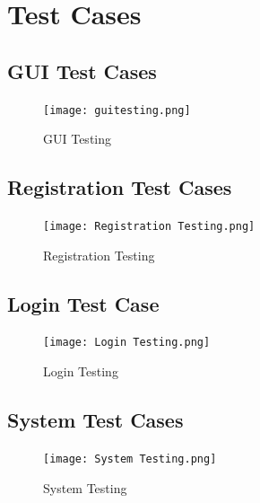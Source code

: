 \documentclass[12pt]{report}
\begin{document}
\clearpage


\centering
\section{Test Cases}
\justifying
\setlength{\parindent}{4em}
\setlength{\parskip}{0.5em}
\renewcommand{\baselinestretch}{1.5}
\normalsize
\subsection{GUI Test Cases}
\begin{figure}[h]
\centering
\texttt{[image: guitesting.png]}
\caption{GUI Testing
}
\label{GUI Testing
}
\end{figure}

\vspace{1cm}
\clearpage

\subsection{Registration Test Cases}

\begin{figure}[h]
\centering
\texttt{[image: Registration Testing.png]}
\caption{Registration Testing
}
\label{Registration Testing
}
\end{figure}

\vspace{1cm}
\clearpage

\subsection{Login Test Case}
\begin{figure}[h]
\centering
\texttt{[image: Login Testing.png]}
\caption{Login Testing
}
\label{Login Testing
}
\end{figure}

\vspace{1cm}
\clearpage

\subsection{System Test Cases}
\begin{figure}[h]
\centering
\texttt{[image: System Testing.png]}
\caption{System Testing}
\label{System Testing
}
\end{figure}

\vspace{1cm}
\clearpage


\centering
\end{document}
